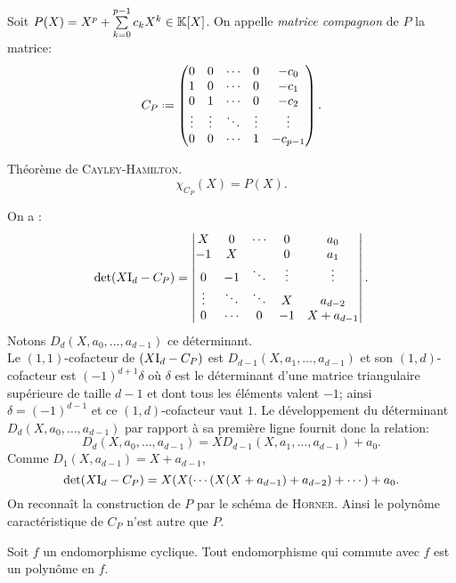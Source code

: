 \begin{defi}
    Soit $P(X) = X^p + \sum\limits_{k=0}^{p-1} c_kX^k \in \mathbb{K}[X]$. On appelle \emph{matrice compagnon} de $P$ la matrice:
$$ C_P \defeq
\begin{pmatrix}
0 & 0 & \cdots & 0 & -c_0\\
1 & 0 & \cdots & 0 & -c_1\\
0 & 1 & \cdots & 0 & -c_2\\
\vdots & \vdots & \ddots & \vdots & \vdots\\
0 & 0 & \cdots & 1 & -c_{p-1}
\end{pmatrix}.
$$
\end{defi}

\begin{theo}
    Théorème de \textsc{Cayley}-\textsc{Hamilton}.
    $$\chi_{C_P}(X) = P(X).$$
\end{theo}    

\begin{preuve}
    On a :
    $$
    \det(X \mathrm{I}_d - C_P) = 
    \begin{vmatrix}
        X & 0 & \cdots & 0 & a_0 \\
        -1 & X & & 0 & a_1 \\
        0 & -1 & \ddots & \vdots & \vdots \\
        \vdots & \ddots & \ddots & X & a_{d-2} \\
        0 & \cdots & 0 & -1 & X + a_{d-1}
    \end{vmatrix}.
    $$
    Notons $D_d(X, a_0, \dots, a_{d-1})$ ce déterminant. \\
    Le $(1,1)$-cofacteur de $(X \mathrm{I}_d - C_P)$ est $D_{d-1}(X, a_1, \dots, a_{d-1})$ et son $(1,d)$-cofacteur est $(-1)^{d+1} \delta$ où $\delta$ est le déterminant d'une matrice triangulaire supérieure de taille $d-1$ et dont tous les éléments valent $-1$; ainsi $\delta = (-1)^{d-1}$ et ce $(1,d)$-cofacteur vaut $1$. Le développement du déterminant $D_d(X, a_0, \dots, a_{d-1})$ par rapport à sa première ligne fournit donc la relation:
    $$D_d(X, a_0, \dots, a_{d-1}) = X D_{d-1}(X, a_1, \dots, a_{d-1}) + a_0.$$
    Comme $D_1(X, a_{d-1}) = X + a_{d-1}$,
    $$\det(X \mathrm{I}_d - C_P) = X(X(\cdots(X(X+a_{d-1}) + a_{d-2}) + \cdots) + a_0.$$
    On reconnaît la construction de $P$ par le schéma de \textsc{Horner}. Ainsi le polynôme caractéristique de $C_P$ n'est autre que $P$. 
\end{preuve} 

\begin{prop}
    Soit $f$ un endomorphisme cyclique. Tout endomorphisme qui commute avec $f$ est un polynôme en $f$.
\end{prop}

